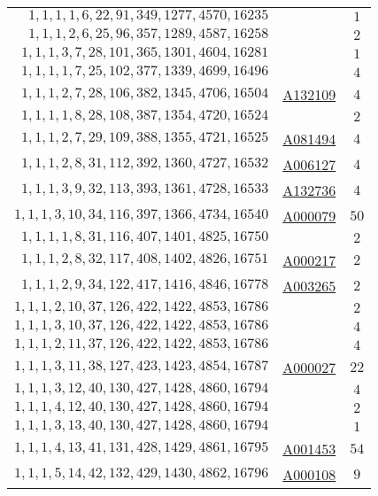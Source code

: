 \begin{longtabu}{|r|l|c|}
    \(    1,    1,    1,    1,    6,   22,   91,  349, 1277, 4570,16235\) &	& \(1\)\\
    \(    1,    1,    1,    2,    6,   25,   96,  357, 1289, 4587,16258\) &	& \(2\)\\
    \(    1,    1,    1,    3,    7,   28,  101,  365, 1301, 4604,16281\) &	& \(1\)\\
    \(    1,    1,    1,    1,    7,   25,  102,  377, 1339, 4699,16496\) &	& \(4\)\\
    \(    1,    1,    1,    2,    7,   28,  106,  382, 1345, 4706,16504\) &	\href{http://oeis.org/A132109}{A132109} & \(4\)\\
    \(    1,    1,    1,    1,    8,   28,  108,  387, 1354, 4720,16524\) &	& \(2\)\\
    \(    1,    1,    1,    2,    7,   29,  109,  388, 1355, 4721,16525\) & \href{http://oeis.org/A081494}{A081494}	& \(4\)\\
    \(    1,    1,    1,    2,    8,   31,  112,  392, 1360, 4727,16532\) &	\href{http://oeis.org/A006127}{A006127} & \(4\)\\
    \(    1,    1,    1,    3,    9,   32,  113,  393, 1361, 4728,16533\) &	\href{http://oeis.org/A132736}{A132736} & \(4\)\\
    \(    1,    1,    1,    3,   10,   34,  116,  397, 1366, 4734,16540\) &	\href{http://oeis.org/A000079}{A000079} & \(50\)\\
    \(    1,    1,    1,    1,    8,   31,  116,  407, 1401, 4825,16750\) &	& \(2\)\\
    \(    1,    1,    1,    2,    8,   32,  117,  408, 1402, 4826,16751\) &	\href{http://oeis.org/A000217}{A000217} & \(2\)\\
    \(    1,    1,    1,    2,    9,   34,  122,  417, 1416, 4846,16778\) & \href{http://oeis.org/A003265}{A003265}	& \(2\)\\
    \(    1,    1,    1,    2,   10,   37,  126,  422, 1422, 4853,16786\) &	& \(2\)\\
    \(    1,    1,    1,    3,   10,   37,  126,  422, 1422, 4853,16786\) &	& \(4\)\\
    \(    1,    1,    1,    2,   11,   37,  126,  422, 1422, 4853,16786\) &	& \(4\)\\
    \(    1,    1,    1,    3,   11,   38,  127,  423, 1423, 4854,16787\) &	\href{http://oeis.org/A000027}{A000027} & \(22\)\\
    \(    1,    1,    1,    3,   12,   40,  130,  427, 1428, 4860,16794\) &	& \(4\)\\
    \(    1,    1,    1,    4,   12,   40,  130,  427, 1428, 4860,16794\) &	& \(2\)\\
    \(    1,    1,    1,    3,   13,   40,  130,  427, 1428, 4860,16794\) &	& \(1\)\\
    \(    1,    1,    1,    4,   13,   41,  131,  428, 1429, 4861,16795\) &	\href{http://oeis.org/A001453}{A001453} & \(54\)\\
    \(    1,    1,    1,    5,   14,   42,  132,  429, 1430, 4862,16796\) &	\href{http://oeis.org/A000108}{A000108} & \(9\)\\
    \hline
\end{longtabu}
